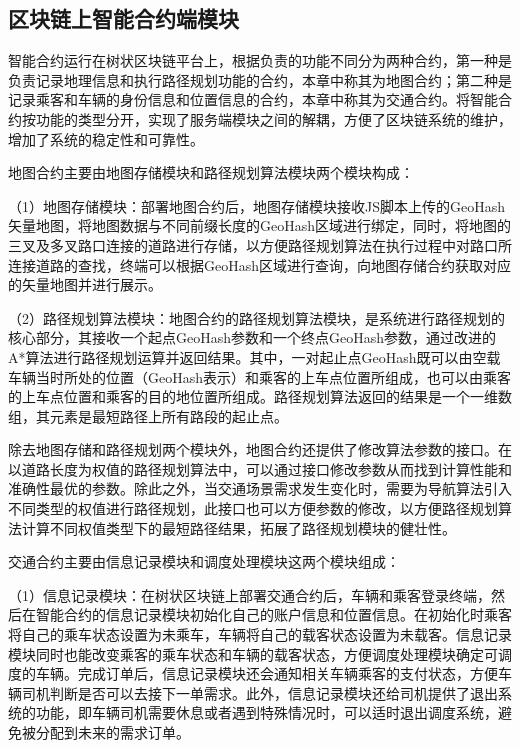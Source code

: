 \subsection{区块链上智能合约端模块}
智能合约运行在树状区块链平台上，根据负责的功能不同分为两种合约，第一种是负责记录地理信息和执行路径规划功能的合约，本章中称其为地图合约；第二种是记录乘客和车辆的身份信息和位置信息的合约，本章中称其为交通合约。将智能合约按功能的类型分开，实现了服务端模块之间的解耦，方便了区块链系统的维护，增加了系统的稳定性和可靠性。\par

地图合约主要由地图存储模块和路径规划算法模块两个模块构成：\par
（1）地图存储模块：部署地图合约后，地图存储模块接收JS脚本上传的GeoHash矢量地图，将地图数据与不同前缀长度的GeoHash区域进行绑定，同时，将地图的三叉及多叉路口连接的道路进行存储，以方便路径规划算法在执行过程中对路口所连接道路的查找，终端可以根据GeoHash区域进行查询，向地图存储合约获取对应的矢量地图并进行展示。\par

（2）路径规划算法模块：地图合约的路径规划算法模块，是系统进行路径规划的核心部分，其接收一个起点GeoHash参数和一个终点GeoHash参数，通过改进的A*算法进行路径规划运算并返回结果。其中，一对起止点GeoHash既可以由空载车辆当时所处的位置（GeoHash表示）和乘客的上车点位置所组成，也可以由乘客的上车点位置和乘客的目的地位置所组成。路径规划算法返回的结果是一个一维数组，其元素是最短路径上所有路段的起止点。\par

除去地图存储和路径规划两个模块外，地图合约还提供了修改算法参数的接口。在以道路长度为权值的路径规划算法中，可以通过接口修改参数从而找到计算性能和准确性最优的参数。除此之外，当交通场景需求发生变化时，需要为导航算法引入不同类型的权值进行路径规划，此接口也可以方便参数的修改，以方便路径规划算法计算不同权值类型下的最短路径结果，拓展了路径规划模块的健壮性。\par

交通合约主要由信息记录模块和调度处理模块这两个模块组成：\par

（1）信息记录模块：在树状区块链上部署交通合约后，车辆和乘客登录终端，然后在智能合约的信息记录模块初始化自己的账户信息和位置信息。在初始化时乘客将自己的乘车状态设置为未乘车，车辆将自己的载客状态设置为未载客。信息记录模块同时也能改变乘客的乘车状态和车辆的载客状态，方便调度处理模块确定可调度的车辆。完成订单后，信息记录模块还会通知相关车辆乘客的支付状态，方便车辆司机判断是否可以去接下一单需求。此外，信息记录模块还给司机提供了退出系统的功能，即车辆司机需要休息或者遇到特殊情况时，可以适时退出调度系统，避免被分配到未来的需求订单。\par

